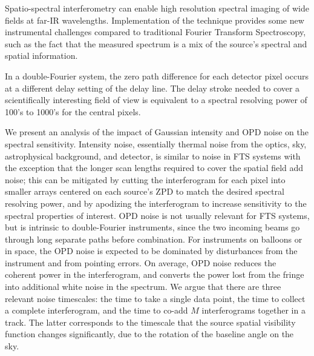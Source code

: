 Spatio-spectral interferometry can enable high resolution spectral imaging of wide fields at
far-IR wavelengths. Implementation of the technique provides some new instrumental
challenges compared to traditional Fourier Transform Spectroscopy, such as the fact that the measured spectrum is a mix of the source's spectral and spatial information.


In a double-Fourier system, the zero path difference for each detector pixel occurs at a different delay setting of the delay line. The delay stroke needed to cover a scientifically interesting field of view is equivalent to a spectral resolving power of 100's to 1000's for the central pixels.

We present an analysis of the impact of Gaussian intensity and OPD noise on the spectral sensitivity.
Intensity noise, essentially thermal noise from the optics, sky, astrophysical background, and detector, is similar to noise in 
FTS systems with the exception that the longer scan lengths required to cover the spatial
field add noise; this can be mitigated by cutting the interferogram for each pixel  into smaller arrays centered on each source's ZPD to match the desired spectral resolving power, and by apodizing the interferogram to increase sensitivity to the spectral properties of interest. OPD noise is not usually relevant for FTS systems, but is intrinsic to double-Fourier instruments, since the two incoming beams go through long separate paths before combination. For instruments on balloons or in space, the OPD noise is expected to be dominated by disturbances from the instrument and from pointing errors. On average, OPD noise reduces the coherent power in the interferogram, and converts the power lost from the fringe into additional white noise in the spectrum. We argue that there are three relevant noise timescales: the time to take a single data point, the time to collect a complete interferogram, and the time to co-add $M$ interferograms together in a track. The latter corresponds to the timescale that the source spatial visibility function changes significantly, due to the rotation of the baseline angle on the sky.

